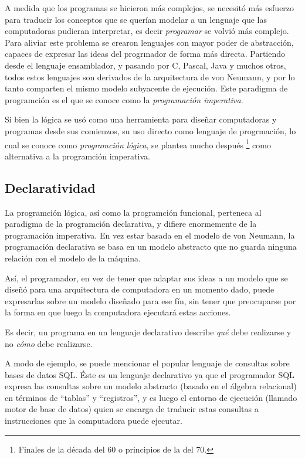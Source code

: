 \documentclass[12pt,titlepage]{article}
\begin{document}
A medida que los programas se hicieron más complejos, se necesitó más esfuerzo para traducir los conceptos que se querían modelar a un lenguaje que las computadoras pudieran interpretar, es decir \emph{programar} se volvió más complejo. Para aliviar este problema se crearon lenguajes con mayor poder de abstracción, capaces de expresar las ideas del progrmador de forma más directa. Partiendo desde el lenguaje ensamblador, y pasando por C, Pascal, Java y muchos otros, todos estos lenguajes son derivados de la arquitectura de von Neumann, y por lo tanto comparten el mismo modelo subyacente de ejecución. Este paradigma de programción es el que se conoce como la \emph{programación imperativa}.

Si bien la lógica se usó como una herramienta para diseñar computadoras y programas desde sus comienzos, su uso directo como lenguaje de progrmación, lo cual se conoce como \emph{programción lógica}, se plantea mucho después \footnote{Finales de la década del 60 o principios de la del 70.} como alternativa a la programción imperativa.

\subsection{Declaratividad}

La programción lógica, así como la programción funcional, perteneca al paradigma de la programción declarativa, y difiere enormemente de la programación imperativa. En vez estar basada en el modelo de von Neumann, la programación declarativa se basa en un modelo abstracto que no guarda ninguna relación con el modelo de la máquina. 

Así, el programador, en vez de tener que adaptar sus ideas a un modelo que se diseñó para una arquitectura de computadora en un momento dado, puede expresarlas sobre un modelo diseñado para ese fín, sin tener que preocuparse por la forma en que luego la computadora ejecutará estas acciones. 

Es decir, un programa en un lenguaje declarativo describe \emph{qué} debe realizarse y no \emph{cómo} debe realizarse.

A modo de ejemplo, se puede mencionar el popular lenguaje de consultas sobre bases de datos SQL. Éste es un lenguaje declarativo ya que el programador SQL expresa las consultas sobre un modelo abstracto (basado en el álgebra relacional) en términos de ``tablas'' y ``registros'', y es luego el entorno de ejecución (llamado motor de base de datos) quien se encarga de traducir estas consultas a instrucciones que la computadora puede ejecutar.
\end{document}
